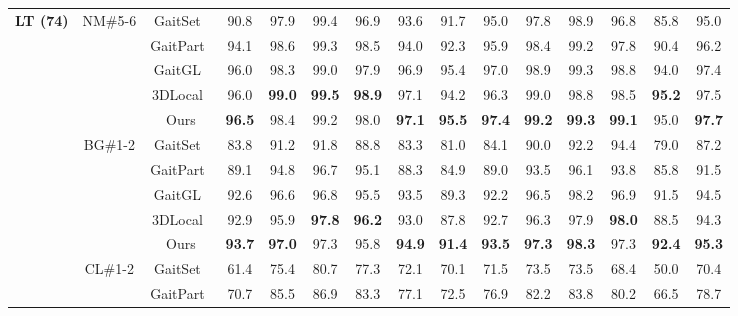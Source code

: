 \documentclass[runningheads]{llncs}
\begin{document}
\begin{table}[ht]
{\begin{tabular}{c|c|c|c|c|c|c|c|c|c|c|c|c|c|c}
    \multicolumn{1}{c|}{\multirow{15}[2]{*}{\textbf{LT (74)}}} & \multicolumn{1}{c|}{\multirow{5}[2]{*}{NM\#5-6}} & GaitSet~\cite{aaai2019gaitset} & 90.8  & 97.9  & 99.4  & 96.9  & 93.6  & 91.7  & 95.0  & 97.8  & 98.9  & 96.8  & 85.8  & 95.0   \\
\cline{3-15}          &       & GaitPart~\cite{gaitpart} & 94.1  & 98.6  & 99.3  & 98.5  & 94.0  & 92.3  & 95.9  & 98.4  & 99.2  & 97.8  & 90.4  & 96.2   \\
\cline{3-15}          &       & \multicolumn{1}{c|}{GaitGL~\cite{gaitgl}} & 96.0  & 98.3  & 99.0  & 97.9  & 96.9  & 95.4  & 97.0  & 98.9  & 99.3  & 98.8  & 94.0  & 97.4   \\
\cline{3-15}          &       & \multicolumn{1}{c|}{3DLocal~\cite{3dlocal}} & 96.0  & \textbf{99.0} & \textbf{99.5} & \textbf{98.9} & 97.1  & 94.2  & 96.3  & 99.0  & 98.8  & 98.5  & \textbf{95.2} & 97.5   \\
\cline{3-15}          &       & Ours  & \textbf{96.5} & 98.4  & 99.2  & 98.0  & \textbf{97.1} & \textbf{95.5} & \textbf{97.4} & \textbf{99.2} & \textbf{99.3} & \textbf{99.1} & 95.0  & \textbf{97.7}  \\
\cline{2-15}          & \multicolumn{1}{c|}{\multirow{5}[2]{*}{BG\#1-2}} & GaitSet~\cite{aaai2019gaitset} & 83.8  & 91.2  & 91.8  & 88.8  & 83.3  & 81.0  & 84.1  & 90.0  & 92.2  & 94.4  & 79.0  & 87.2   \\
\cline{3-15}          &       & GaitPart~\cite{gaitpart} & 89.1  & 94.8  & 96.7  & 95.1  & 88.3  & 84.9  & 89.0  & 93.5  & 96.1  & 93.8  & 85.8  & 91.5   \\
\cline{3-15}          &       & \multicolumn{1}{c|}{GaitGL~\cite{gaitgl}} & 92.6  & 96.6  & 96.8  & 95.5  & 93.5  & 89.3  & 92.2  & 96.5  & 98.2  & 96.9  & 91.5  & 94.5   \\
\cline{3-15}          &       & \multicolumn{1}{c|}{3DLocal~\cite{3dlocal}} & 92.9  & 95.9  & \textbf{97.8} & \textbf{96.2} & 93.0  & 87.8  & 92.7  & 96.3  & 97.9  & \textbf{98.0} & 88.5  & 94.3   \\
\cline{3-15}          &       & Ours  & \textbf{93.7} & \textbf{97.0} & 97.3  & 95.8  & \textbf{94.9} & \textbf{91.4} & \textbf{93.5} & \textbf{97.3} & \textbf{98.3} & 97.3  & \textbf{92.4} & \textbf{95.3}  \\
\cline{2-15}          & \multicolumn{1}{c|}{\multirow{5}[2]{*}{CL\#1-2}} & GaitSet~\cite{aaai2019gaitset} & 61.4  & 75.4  & 80.7  & 77.3  & 72.1  & 70.1  & 71.5  & 73.5  & 73.5  & 68.4  & 50.0  & 70.4   \\
\cline{3-15}          &       & GaitPart~\cite{gaitpart} & 70.7  & 85.5  & 86.9  & 83.3  & 77.1  & 72.5  & 76.9  & 82.2  & 83.8  & 80.2  & 66.5  & 78.7   \\

\end{tabular}}
\end{table}
\end{document}
